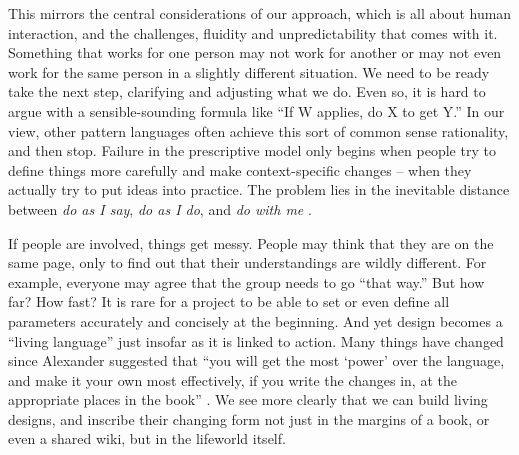
This mirrors the central considerations of our approach, which is all about human interaction, and the challenges, fluidity and unpredictability that comes with it.  Something that works for one person may not work for another or may not even work for the same person in a slightly different situation.  We need to be ready take the next step, clarifying and adjusting what we do.   Even so, it is hard to argue with a sensible-sounding formula like ``If W applies, do X to get Y.'' In our view, other pattern languages often achieve this sort of common sense rationality, and then stop.  Failure in the prescriptive model only begins when people try to define things more carefully and make context-specific changes -- when they actually try to put ideas into practice.  The problem lies in the inevitable distance between \emph{do as I say}, \emph{do as I do}, and \emph{do with me} \cite[p.~26]{deleuze1994difference}.

If people are involved, things get messy.   People may think that they are on the same page, only to find out that their understandings are wildly different.  For  example, everyone may agree that the group needs to go ``that way.''  But how far?  How fast?  It is rare for a project to be able to set or even define all parameters accurately and concisely at the beginning.
And yet design becomes a ``living language'' \cite[p.~xvii]{alexander1977pattern}  just insofar as it is linked to action.  Many things have changed since Alexander suggested that ``you will get the most `power' over the language, and make it your own most effectively, if you write the changes in, at the appropriate places in the book'' \cite[p.~xl]{alexander1977pattern}.  We see more clearly that we can build living designs, and inscribe their changing form not just in the margins of a book, or even a shared wiki, but in the lifeworld itself.  


